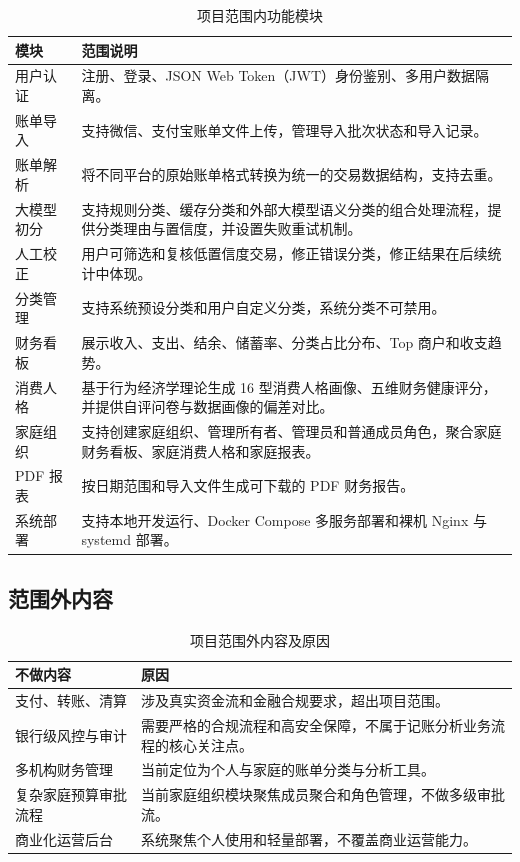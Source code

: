 \begin{table}[H]
\centering
\caption{项目范围内功能模块}
\label{tab:in-scope}
\begin{tabular}{p{3cm}p{10.2cm}}
\toprule
\textbf{模块} & \textbf{范围说明} \\
\midrule
用户认证 & 注册、登录、JSON Web Token（JWT）身份鉴别、多用户数据隔离。 \\
账单导入 & 支持微信、支付宝账单文件上传，管理导入批次状态和导入记录。 \\
账单解析 & 将不同平台的原始账单格式转换为统一的交易数据结构，支持去重。 \\
大模型初分 & 支持规则分类、缓存分类和外部大模型语义分类的组合处理流程，提供分类理由与置信度，并设置失败重试机制。 \\
人工校正 & 用户可筛选和复核低置信度交易，修正错误分类，修正结果在后续统计中体现。 \\
分类管理 & 支持系统预设分类和用户自定义分类，系统分类不可禁用。 \\
财务看板 & 展示收入、支出、结余、储蓄率、分类占比分布、Top 商户和收支趋势。 \\
消费人格 & 基于行为经济学理论生成 16 型消费人格画像、五维财务健康评分，并提供自评问卷与数据画像的偏差对比。 \\
家庭组织 & 支持创建家庭组织、管理所有者、管理员和普通成员角色，聚合家庭财务看板、家庭消费人格和家庭报表。 \\
PDF 报表 & 按日期范围和导入文件生成可下载的 PDF 财务报告。 \\
系统部署 & 支持本地开发运行、Docker Compose 多服务部署和裸机 Nginx 与 systemd 部署。 \\
\bottomrule
\end{tabular}
\end{table}

\subsection{范围外内容}

\begin{table}[H]
\centering
\caption{项目范围外内容及原因}
\label{tab:out-scope}
\begin{tabular}{p{4.2cm}p{9cm}}
\toprule
\textbf{不做内容} & \textbf{原因} \\
\midrule
支付、转账、清算 & 涉及真实资金流和金融合规要求，超出项目范围。 \\
银行级风控与审计 & 需要严格的合规流程和高安全保障，不属于记账分析业务流程的核心关注点。 \\
多机构财务管理 & 当前定位为个人与家庭的账单分类与分析工具。 \\
复杂家庭预算审批流程 & 当前家庭组织模块聚焦成员聚合和角色管理，不做多级审批流。 \\
商业化运营后台 & 系统聚焦个人使用和轻量部署，不覆盖商业运营能力。 \\
\bottomrule
\end{tabular}
\end{table}

